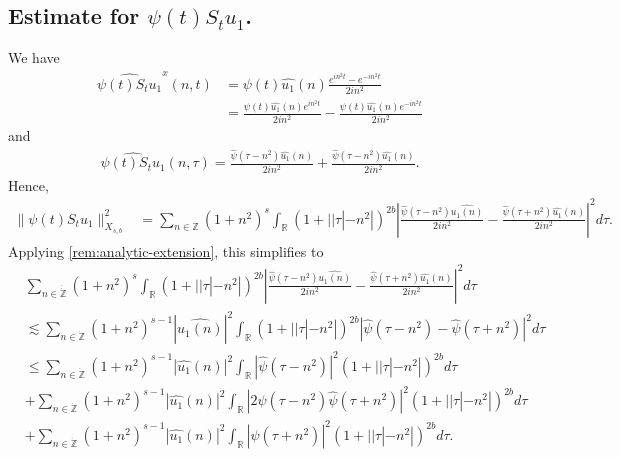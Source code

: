 \documentclass[12pt,reqno]{amsart}
\numberwithin{equation}{section}  %
\numberwithin{figure}{section}
\newcommand{\rr}{\mathbb{R}}
\newcommand{\zz}{\mathbb{Z}}
\newcommand{\wh}{\widehat}
\begin{document}
\subsection{Estimate for $\psi(t) S_{t}u_{1}$.}
We have
%
%
\begin{equation*}
  \begin{split}
    \wh{\psi(t)S_{t}u_{1}}^{x}(n, t)
    & = \psi(t) \wh{u_{1}}(n) \frac{e^{in^2 t} - e^{-in^{2}t}}{2i n^{2}}
    \\
    & = \frac{\psi(t) \wh{u_{1}}(n)e^{in^{2}t}}{2i n^{2}} - \frac{\psi(t)
    \wh{u_{1}}(n)e^{-in^{2}t}}{2i n^{2}}  
  \end{split}
\end{equation*}
%
%
and
%
%
\begin{equation*}
  \begin{split}
    \wh{\psi(t) S_{t}u_{1}}(n, \tau) = \frac{\wh{\psi}(\tau -
    n^{2})\wh{u_{1}}(n)}{2i n^{2}} + \frac{\wh{\psi}(\tau - n^{2})\wh{u_{1}}(n)}{2i
    n^{2}}.
  \end{split}
\end{equation*}
%
%
Hence,
%
%
\begin{equation*}
  \begin{split}
    \| \psi(t) S_{t}u_{1} \|_{X_{s,b}}^{2} 
    & = \sum_{n \in \zz}(1 + n^{2})^{s} \int_{\rr}\left( 1 + | | \tau
    |-n^{2} | \right)^{2b} | \frac{\wh{\psi}(\tau - n^{2})\wh{u_{1}(n)}}{2i
    n^{2}} -
    \frac{\wh{\psi}(\tau + n^{2})\wh{u_{1}}(n)}{2i n^{2}} |^{2} d \tau.
    \end{split}
\end{equation*}
%
Applying \ref{rem:analytic-extension}, this simplifies to
%
%
\begin{equation}
\begin{split}
  & \sum_{n \in \dot{\dot{\zz}}}(1 + n^{2})^{s} \int_{\rr}\left( 1 + | | \tau
    |-n^{2} | \right)^{2b} | \frac{\wh{\psi}(\tau - n^{2})\wh{u_{1}(n)}}{2i
    n^{2}} -
    \frac{\wh{\psi}(\tau + n^{2})\wh{u_{1}}(n)}{2i n^{2}} |^{2} d \tau
    \\
    & \lesssim \sum_{n \in \dot{\zz}}(1 + n^{2})^{s-1} | \wh{u_{1}(n)} |^{2} \int_{\rr}
    \left( 1 + | | \tau | - n^{2} | \right)^{2b} | \wh{\psi}(\tau - n^{2}) -
    \wh{\psi}(\tau + n^{2}) |^{2} d \tau
    \\
    & \le \sum_{n \in \dot{\zz}} \left( 1 + n^{2} \right)^{s-1} | \wh{u_{1}}(n)
    |^{2} \int_{\rr} | \wh{\psi}(\tau - n^{2}) |^{2}\left( 1 + | | \tau | -
    n^{2} | \right)^{2b} d \tau
    \\
    & + \sum_{n \in \dot{\zz}} \left( 1 + n^{2} \right)^{s-1} | \wh{u_{1}}(n)
    |^{2} \int_{\rr} | 2\wh{\psi}(\tau - n^{2})\wh{\psi}(\tau + n^{2}) |^{2}\left( 1 + | | \tau | -
    n^{2} | \right)^{2b} d \tau
    \\
    & + \sum_{n \in \dot{\zz}} \left( 1 + n^{2} \right)^{s-1} | \wh{u_{1}}(n)
    |^{2} \int_{\rr} | \wh{\psi}(\tau + n^{2}) |^{2}\left( 1 + | | \tau | -
    n^{2} | \right)^{2b} d \tau.
\end{split}
\label{u-1-norm-comp}
\end{equation}
\end{document}

